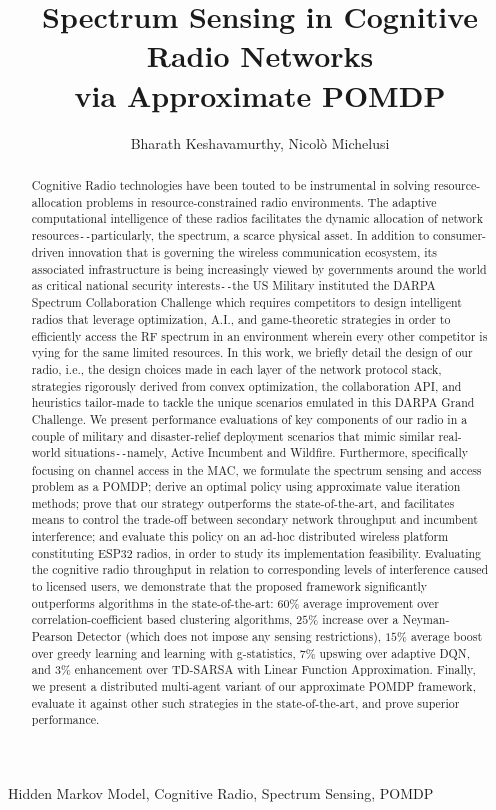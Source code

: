 \documentclass[12pt, draftcls, onecolumn]{IEEEtran}
\title{Spectrum Sensing in Cognitive Radio Networks
\\
via Approximate POMDP}
\author{Bharath Keshavamurthy, Nicol\`{o} Michelusi
\vspace{-8mm}}
\begin{document}
\maketitle
\thispagestyle{empty}
\pagestyle{empty} 
\begin{abstract}
Cognitive Radio technologies have been touted to be instrumental in solving resource-allocation problems in resource-constrained radio environments. The adaptive computational intelligence of these radios facilitates the dynamic allocation of network resources\texttt{-{}-}particularly, the spectrum, a scarce physical asset. In addition to consumer-driven innovation that is governing the wireless communication ecosystem, its associated infrastructure is being increasingly viewed by governments around the world as critical national security interests\texttt{-{}-}the US Military instituted the DARPA Spectrum Collaboration Challenge which requires competitors to design intelligent radios that leverage optimization, A.I., and game-theoretic strategies in order to efficiently access the RF spectrum in an environment wherein every other competitor is vying for the same limited resources. In this work, we briefly detail the design of our radio, i.e., the design choices made in each layer of the network protocol stack, strategies rigorously derived from convex optimization, the collaboration API, and heuristics tailor-made to tackle the unique scenarios emulated in this DARPA Grand Challenge. We present performance evaluations of key components of our radio in a couple of military and disaster-relief deployment scenarios that mimic similar real-world situations\texttt{-{}-}namely, Active Incumbent and Wildfire. Furthermore, specifically focusing on channel access in the MAC, we formulate the spectrum sensing and access problem as a POMDP; derive an optimal policy using approximate value iteration methods; prove that our strategy outperforms the state-of-the-art, and facilitates means to control the trade-off between secondary network throughput and incumbent interference; and evaluate this policy on an ad-hoc distributed wireless platform constituting ESP32 radios, in order to study its implementation feasibility. Evaluating the cognitive radio throughput in relation to corresponding levels of interference caused to licensed users, we demonstrate that the proposed framework significantly outperforms algorithms in the state-of-the-art: $60$\% average improvement over correlation-coefficient based clustering algorithms, $25$\% increase over a Neyman-Pearson Detector (which does not impose any sensing restrictions), $15$\% average boost over greedy learning and learning with g-statistics, $7$\% upswing over adaptive DQN, and $3$\% enhancement over TD-SARSA with Linear Function Approximation. Finally, we present a distributed multi-agent variant of our approximate POMDP framework, evaluate it against other such strategies in the state-of-the-art, and prove superior performance.
\end{abstract}
\begin{IEEEkeywords}
Hidden Markov Model, Cognitive Radio, Spectrum Sensing, POMDP
\end{IEEEkeywords}
\end{document}
